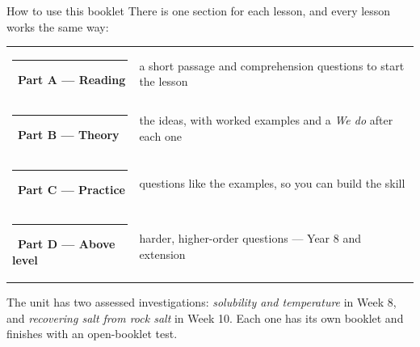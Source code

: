 \documentclass[11pt,a4paper]{article}
\begin{document}
\begin{infobox}{How to use this booklet}
There is one section for each lesson, and every lesson works the same way:

\medskip
\begin{tabular}{@{}ll@{}}
  \textcolor{Teal}{\rule{10pt}{10pt}}\ \textbf{Part A --- Reading} & a short passage and comprehension questions to start the lesson \\
  \textcolor{Blue}{\rule{10pt}{10pt}}\ \textbf{Part B --- Theory} & the ideas, with worked examples and a \emph{We do} after each one \\
  \textcolor{Amber}{\rule{10pt}{10pt}}\ \textbf{Part C --- Practice} & questions like the examples, so you can build the skill \\
  \textcolor{Violet}{\rule{10pt}{10pt}}\ \textbf{Part D --- Above level} & harder, higher-order questions --- Year 8 and extension \\
\end{tabular}

\medskip
The unit has two assessed investigations: \emph{solubility and temperature} in Week 8, and \emph{recovering salt from rock salt} in Week 10. Each one has its own booklet and finishes with an open-booklet test.
\end{infobox}

\vspace{8pt}
\end{document}
